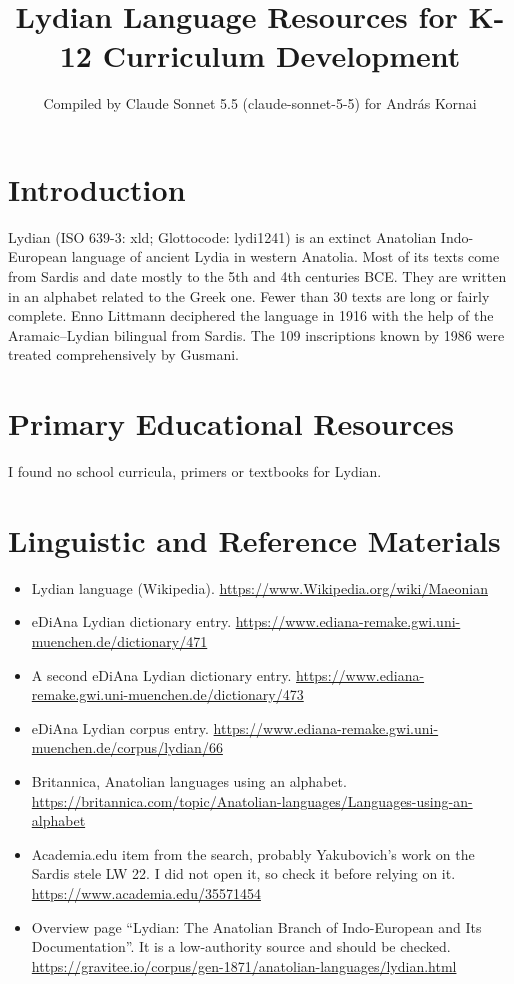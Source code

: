\documentclass[12pt]{article}
\title{Lydian Language Resources for K-12 Curriculum Development}
\author{Compiled by Claude Sonnet 5.5 (claude-sonnet-5-5) for Andr\'as Kornai}
\date{}
\begin{document}
\maketitle

\section{Introduction}
Lydian (ISO 639-3: xld; Glottocode: lydi1241) is an extinct Anatolian Indo-European language of ancient Lydia in western Anatolia. Most of its texts come from Sardis and date mostly to the 5th and 4th centuries BCE. They are written in an alphabet related to the Greek one. Fewer than 30 texts are long or fairly complete. Enno Littmann deciphered the language in 1916 with the help of the Aramaic--Lydian bilingual from Sardis. The 109 inscriptions known by 1986 were treated comprehensively by Gusmani.

\section{Primary Educational Resources}
I found no school curricula, primers or textbooks for Lydian.

\section{Linguistic and Reference Materials}
\begin{itemize}
\item Lydian language (Wikipedia). \url{https://www.Wikipedia.org/wiki/Maeonian}
\item eDiAna Lydian dictionary entry. \url{https://www.ediana-remake.gwi.uni-muenchen.de/dictionary/471}
\item A second eDiAna Lydian dictionary entry. \url{https://www.ediana-remake.gwi.uni-muenchen.de/dictionary/473}
\item eDiAna Lydian corpus entry. \url{https://www.ediana-remake.gwi.uni-muenchen.de/corpus/lydian/66}
\item Britannica, Anatolian languages using an alphabet. \url{https://britannica.com/topic/Anatolian-languages/Languages-using-an-alphabet}
\item Academia.edu item from the search, probably Yakubovich's work on the Sardis stele LW 22. I did not open it, so check it before relying on it. \url{https://www.academia.edu/35571454}
\item Overview page ``Lydian: The Anatolian Branch of Indo-European and Its Documentation''. It is a low-authority source and should be checked. \url{https://gravitee.io/corpus/gen-1871/anatolian-languages/lydian.html}
\end{itemize}
\end{document}
